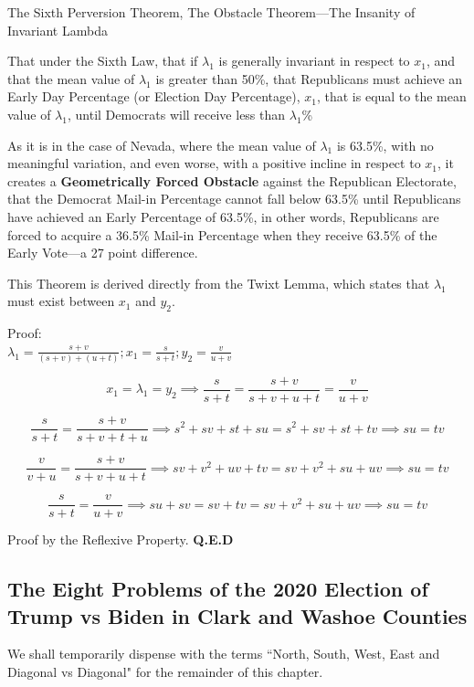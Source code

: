\newpage
\begin{theorem}{The Sixth Perversion Theorem, The Obstacle Theorem---The Insanity of Invariant Lambda}

That under the Sixth Law, that if $\lambda_{1}$ is generally invariant in respect to $x_{1}$, and that the mean value of $\lambda_{1}$ is greater than 50\%, that Republicans must achieve an Early Day Percentage (or Election Day Percentage), $x_{1}$, that is equal to the mean value of $\lambda_{1}$, until Democrats will receive less than $\lambda_{1}$\%

As it is in the case of Nevada, where the mean value of $\lambda_{1}$ is 63.5\%, with no meaningful variation, and even worse, with a positive incline in respect to $x_{1}$, it creates a \textbf{ Geometrically Forced Obstacle} against the Republican Electorate, that the Democrat Mail-in Percentage cannot fall below 63.5\% until Republicans have achieved an Early Percentage of 63.5\%, in other words, Republicans are forced to acquire a 36.5\% Mail-in Percentage when they receive 63.5\% of the Early Vote---a 27 point difference.

This Theorem is derived directly from the Twixt Lemma, which states that $\lambda_{1}$ must exist between $x_{1}$ and $y_{2}$.

Proof:\\
$\lambda_{1}=\frac{s+v}{(s+v)+(u+t)}; x_{1}=\frac{s}{s+t}; y_{2}=\frac{v}{u+v}$

$$x_{1}=\lambda_{1}=y_{2} \implies \frac{s}{s+t}=\frac{s+v}{s+v+u+t}=\frac{v}{u+v}$$

$$\frac{s}{s+t}=\frac{s+v}{s+v+t+u} \implies s^2+sv+st+su=s^2+sv+st+tv \implies  su=tv$$

$$\frac{v}{v+u}=\frac{s+v}{s+v+u+t} \implies sv+v^2+uv+tv = sv+v^2+su+uv \implies su=tv$$

$$\frac{s}{s+t}=\frac{v}{u+v} \implies su+sv = sv+tv = sv+v^2+su+uv \implies su=tv$$
\begin{flushright}
Proof by the Reflexive Property.
\textbf{Q.E.D}
\end{flushright}
\end{theorem}
\newpage
\subsection{The Eight Problems of the 2020 Election of Trump vs Biden in Clark and Washoe Counties}
We shall temporarily dispense with the terms ``North, South, West, East and Diagonal vs Diagonal" for the remainder of this chapter.

